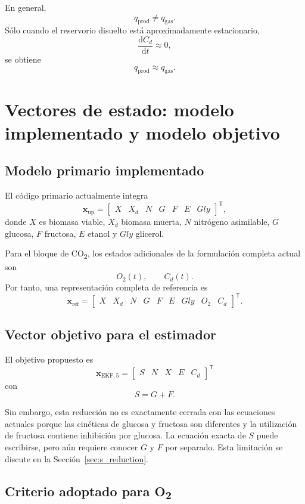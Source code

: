\documentclass[11pt,a4paper]{article}
\newcommand{\dd}{\mathrm{d}}
\begin{document}
En general,
\[
q_{\mathrm{prod}}\neq q_{\mathrm{gas}}.
\]
Sólo cuando el reservorio disuelto está aproximadamente estacionario,
\[
\frac{\dd C_d}{\dd t}\approx 0,
\]
se obtiene
\[
q_{\mathrm{prod}}\approx q_{\mathrm{gas}}.
\]

\section{Vectores de estado: modelo implementado y modelo objetivo}

\subsection{Modelo primario implementado}

El código primario actualmente integra
\[
\mathbf{x}_{\mathrm{up}}=
\begin{bmatrix}
X & X_d & N & G & F & E & Gly
\end{bmatrix}^{\mathsf T},
\]
donde $X$ es biomasa viable, $X_d$ biomasa muerta, $N$ nitrógeno asimilable,
$G$ glucosa, $F$ fructosa, $E$ etanol y $Gly$ glicerol.

Para el bloque de CO\textsubscript{2}, los estados adicionales de la formulación completa actual son
\[
O_2(t),\qquad C_d(t).
\]
Por tanto, una representación completa de referencia es
\[
\mathbf{x}_{\mathrm{ref}}=
\begin{bmatrix}
X & X_d & N & G & F & E & Gly & O_2 & C_d
\end{bmatrix}^{\mathsf T}.
\]

\subsection{Vector objetivo para el estimador}

El objetivo propuesto es
\[
\boxed{
\mathbf{x}_{\mathrm{EKF},5}=
\begin{bmatrix}
S & N & X & E & C_d
\end{bmatrix}^{\mathsf T}}
\]
con
\[
S=G+F.
\]

Sin embargo, esta reducción no es exactamente cerrada con las ecuaciones actuales porque las
cinéticas de glucosa y fructosa son diferentes y la utilización de fructosa contiene inhibición por
glucosa. La ecuación exacta de $S$ puede escribirse, pero aún requiere conocer $G$ y $F$ por separado.
Esta limitación se discute en la Sección~\ref{sec:s_reduction}.

\subsection{Criterio adoptado para O\textsubscript{2}}
\end{document}

